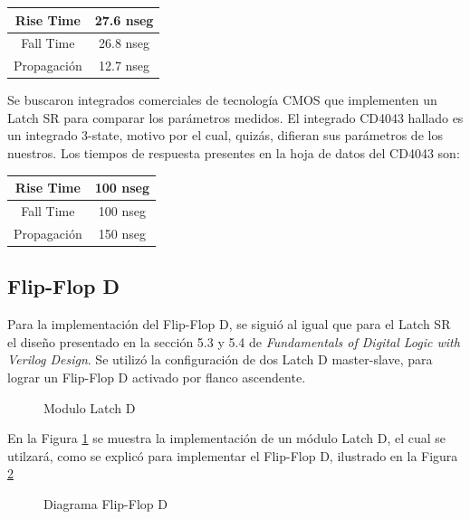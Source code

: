 \begin{center}
\begin{tabular}{|c|c|}
\hline 
Rise Time & 27.6 nseg \\ 
\hline 
Fall Time & 26.8 nseg \\ 
\hline 
Propagación & 12.7 nseg \\ 
\hline 
\end{tabular} 
\end{center}

Se buscaron integrados comerciales de tecnología CMOS que implementen un Latch SR para comparar los parámetros medidos. El integrado CD4043 hallado es un integrado 3-state, motivo por el cual, quizás, difieran sus parámetros de los nuestros. Los tiempos de respuesta presentes en la hoja de datos del CD4043 son:

\begin{center}
\begin{tabular}{|c|c|}
\hline 
Rise Time & 100 nseg \\ 
\hline 
Fall Time & 100 nseg \\ 
\hline 
Propagación & 150 nseg \\ 
\hline 
\end{tabular} 
\end{center}


\subsection*{Flip-Flop D}
Para la implementación del Flip-Flop D, se siguió al igual que para el Latch SR el diseño presentado en la sección 5.3 y 5.4 de \emph{Fundamentals of Digital Logic with Verilog Design}. Se utilizó la configuración de dos Latch D master-slave, para lograr un Flip-Flop D activado por flanco ascendente. 

\begin{figure}[H]
\centering
\resizebox{.5\linewidth}{!}{\parbox{\linewidth}{}}
\caption{Modulo Latch D} \label{6_fig2}
\end{figure}

En la Figura \ref{6_fig2} se muestra la implementación de un módulo Latch D, el cual se utilzará, como se explicó para implementar el Flip-Flop D, ilustrado en la Figura \ref{6_fig3}


\begin{figure}[H]
\centering
\resizebox{.5\linewidth}{!}{\parbox{\linewidth}{}}
\caption{Diagrama Flip-Flop D} \label{6_fig3}
\end{figure}

